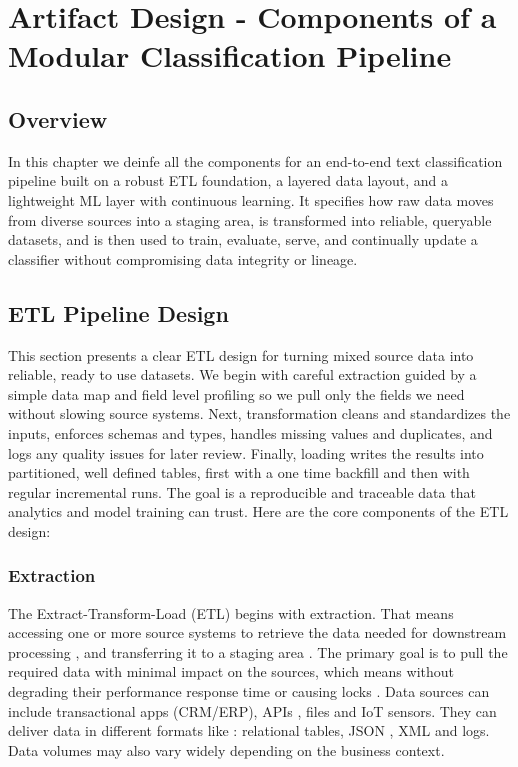 \chapter{Artifact Design - Components of a Modular Classification Pipeline}
\section{Overview}
\label{sec:overview}
In this chapter we deinfe all the components for an end-to-end text classification pipeline built on a robust ETL foundation, a layered data layout, and a lightweight ML layer with continuous learning. It specifies how raw data moves from diverse sources into a staging area, is transformed into reliable, queryable datasets, and is then used to train, evaluate, serve, and continually update a classifier without compromising data integrity or lineage.

\section{ETL Pipeline Design}

This section presents a clear ETL design for turning mixed source data into reliable, ready to use datasets. We begin with careful extraction guided by a simple data map and field level profiling so we pull only the fields we need without slowing source systems. Next, transformation cleans and standardizes the inputs, enforces schemas and types, handles missing values and duplicates, and logs any quality issues for later review. Finally, loading writes the results into partitioned, well defined tables, first with a one time backfill and then with regular incremental runs. The goal is a reproducible and traceable data that analytics and model training can trust. Here are the core components of the ETL design:

\subsection{Extraction}
The Extract-Transform-Load (ETL) begins with extraction. That means accessing one or more source systems to retrieve the data needed for downstream processing , and transferring it to a staging area \cite{mandala:2019} . The primary goal is to pull the required data with minimal impact on the sources, which means without degrading their performance response time or causing locks \cite{gjcs:2023}. Data sources can include transactional apps (CRM/ERP), APIs , files and IoT sensors. They can deliver data in different formats like :  relational tables, JSON , XML and logs. Data volumes may also vary widely depending on the business context.
\smallskip

